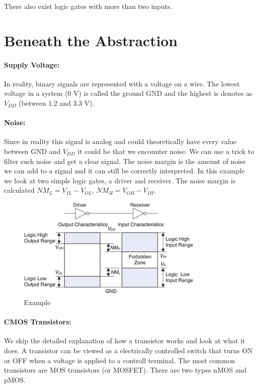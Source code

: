 \documentclass[a4paper]{report}
\begin{document}
There also exist logic gates with more than two inputs.

\section{Beneath the Abstraction}

\paragraph{Supply Voltage:} In reality, binary signals are represented with a voltage on a wire. The lowest
voltage in a system (0 V) is called the ground GND and the highest is denotes as $V_{DD}$ (between 1.2 and 3.3 V).

\paragraph{Noise:} Since in reality this signal is analog and could theoretically have every value between GND and $V_{DD}$ it could
be that we encounter noise. We can use a trick to filter such noise and get a clear signal. The noise margin
is the amount of noise we can add to a signal and it can still be correctly interpreted. In this example we look
at two simple logic gates, a driver and receiver. The noise margin is calculated $NM_L = V_{IL} - V_{OL}$, 
$NM_H = V_{OH} - V_{IH}$.

\begin{figure}[h]
    \centering
    \includegraphics[width=9cm]{noise.jpg}
    \caption{Example}
\end{figure}

\paragraph{CMOS Transistors:} We skip the detailed explanation of how a transistor works and look at what it does.
A transistor can be viewed as a electrically controlled switch that turns ON or OFF when a voltage is applied to a
controll terminal. The most common transistors are MOS transistors (or MOSFET). There are two types nMOS and pMOS. \\
\end{document}
